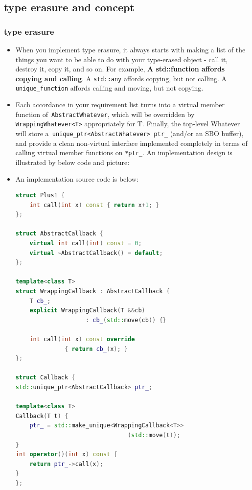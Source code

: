 \documentclass[a4paper,11pt,twoside]{book}
\begin{document}
\subsection{type erasure and concept}

\subsubsection{type erasure}
\begin{itemize}
\item When you implement type erasure, it always starts with making a list of the things you want to be able to do with your type-erased object - call it, destroy it, copy it, and so on. For example, \textbf{A std::function affords copying and calling}. A \texttt{std::any} affords copying, but not calling. A \texttt{unique\_function} affords calling and moving, but not copying.

\item Each accordance in your requirement list turns into a virtual member function of\texttt{ AbstractWhatever}, which will be overridden by \texttt{WrappingWhatever<T>} appropriately for T. Finally, the top-level Whatever will store a\texttt{ unique\_ptr<AbstractWhatever> ptr\_} (and/or an SBO buffer), and provide a clean non-virtual interface implemented completely in terms of calling virtual member functions on \texttt{*ptr\_}. An implementation design is illustrated by below code and picture:



\item An implementation source code is below:
\begin{lstlisting}[frame=single, language=c++]
struct Plus1 {
	int call(int x) const { return x+1; }
};

struct AbstractCallback {
	virtual int call(int) const = 0;
	virtual ~AbstractCallback() = default;
};

template<class T>
struct WrappingCallback : AbstractCallback {
	T cb_;
	explicit WrappingCallback(T &&cb) 
	                : cb_(std::move(cb)) {}
	                
	int call(int x) const override 
	          { return cb_(x); }
};

struct Callback {
std::unique_ptr<AbstractCallback> ptr_;

template<class T>
Callback(T t) {
	ptr_ = std::make_unique<WrappingCallback<T>>
	                            (std::move(t));
}
int operator()(int x) const {
	return ptr_->call(x);
}
};


\end{lstlisting}
\end{itemize}
\end{document}
